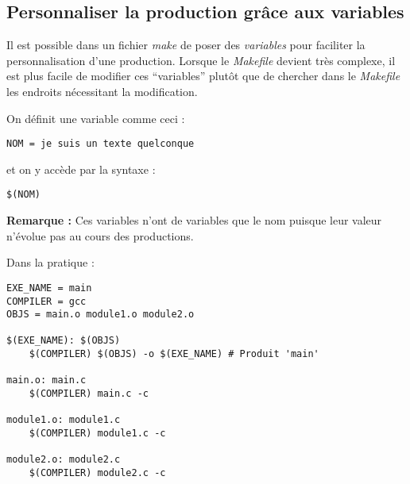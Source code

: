 \documentclass[../../../main.tex]{subfiles}
\begin{document}
\subsection{Personnaliser la production grâce aux variables}
Il est possible dans un fichier \textit{make} de poser des \textit{variables} pour faciliter la personnalisation d'une production. Lorsque le \textit{Makefile} devient très complexe, il est plus facile de modifier ces ``variables'' plutôt que de chercher dans le \textit{Makefile} les endroits nécessitant la modification.
 
On définit une variable comme ceci :
\begin{verbatim}
NOM = je suis un texte quelconque
\end{verbatim}
et on y accède par la syntaxe :
\begin{verbatim}
$(NOM)
\end{verbatim}
\textbf{Remarque : }Ces variables n'ont de variables que le nom puisque leur valeur n'évolue pas au cours des productions.
 
Dans la pratique :
\begin{verbatim}
EXE_NAME = main
COMPILER = gcc
OBJS = main.o module1.o module2.o

$(EXE_NAME): $(OBJS)
	$(COMPILER) $(OBJS) -o $(EXE_NAME) # Produit 'main'

main.o: main.c
	$(COMPILER) main.c -c

module1.o: module1.c
	$(COMPILER) module1.c -c

module2.o: module2.c
	$(COMPILER) module2.c -c
\end{verbatim}
\end{document}
